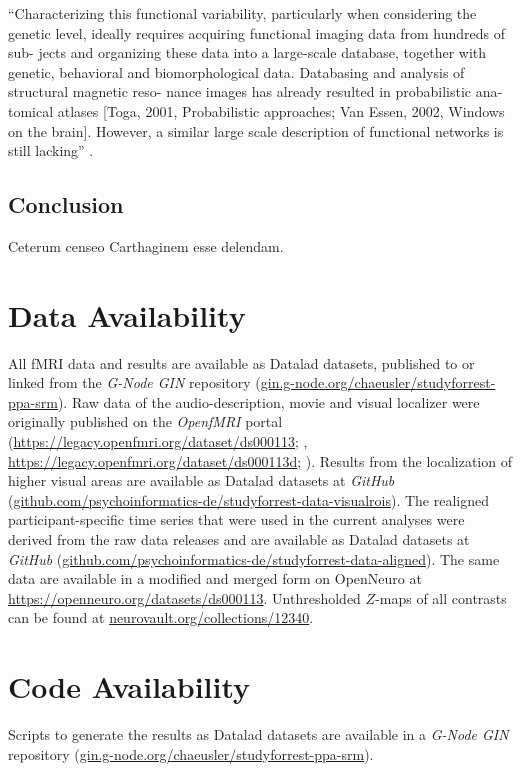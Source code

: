 ``Characterizing this functional variability, particularly when considering the
genetic level, ideally requires acquiring functional imaging data from hundreds
of sub- jects and organizing these data into a large-scale database, together
with genetic, behavioral and biomorphological data. Databasing and analysis of
structural magnetic reso- nance images has already resulted in probabilistic
ana- tomical atlases [Toga, 2001, Probabilistic approaches; Van Essen, 2002,
Windows on the brain]. However, a similar large scale description of
functional networks is still lacking'' \citep{pinel2007fast}.




\subsection{Conclusion}

Ceterum censeo Carthaginem esse delendam.


\section{Data Availability}



All fMRI data and results are available as Datalad \citep{halchenko2021datalad}
datasets, published to or linked from the \emph{G-Node GIN} repository
(\href{https://gin.g-node.org/chaeusler/studyforrest-ppa-srm}{\url{gin.g-node.org/chaeusler/studyforrest-ppa-srm}}).
Raw data of the audio-description, movie and visual localizer were originally
published on the \emph{OpenfMRI} portal
(\url{https://legacy.openfmri.org/dataset/ds000113}; \citep{Hanke2014ds000113},
\space \url{https://legacy.openfmri.org/dataset/ds000113d};
\citep{hanke2016ds000113d}).
Results from the localization of higher visual areas are available as Datalad
datasets at \emph{GitHub}
(\href{https://github.com/psychoinformatics-de/studyforrest-data-visualrois}{\url{github.com/psychoinformatics-de/studyforrest-data-visualrois}}).
The realigned participant-specific time series that were used in the current
analyses were derived from the raw data releases and are available as Datalad
datasets at \emph{GitHub}
(\href{https://github.com/psychoinformatics-de/studyforrest-data-aligned}{\url{github.com/psychoinformatics-de/studyforrest-data-aligned}}).
The same data are available in a modified and merged form on OpenNeuro at
\url{https://openneuro.org/datasets/ds000113}.
Unthresholded $Z$-maps of all contrasts can be found at
\href{https://identifiers.org/neurovault.collection:12340}{\url{neurovault.org/collections/12340}}.


\section*{Code Availability}

Scripts to generate the results as Datalad \citep{halchenko2021datalad} datasets
are available in a \emph{G-Node GIN} repository
(\href{https://gin.g-node.org/chaeusler/studyforrest-ppa-srm}{\url{gin.g-node.org/chaeusler/studyforrest-ppa-srm}}).
